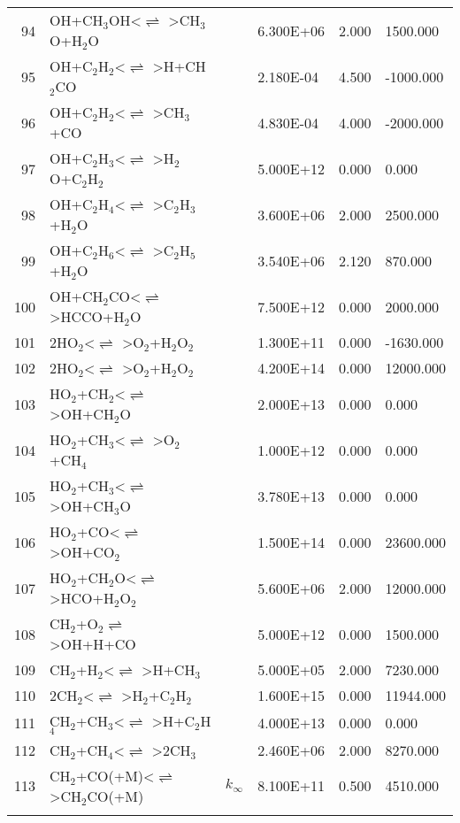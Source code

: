 \documentclass[11pt]{article}
\begin{document}
\begin{table}[hbt]
\begin{tabular}{|r l c l l l|}
94 &	OH+CH$_{3}$OH<$\rightleftharpoons$ >CH$_{3}$O+H$_{2}$O&	&	6.300E+06&	2.000&	1500.000\\ 
95 &	OH+C$_{2}$H$_{2}$<$\rightleftharpoons$ >H+CH$_{2}$CO&	&	2.180E-04&	4.500&	-1000.000\\ 
96 &	OH+C$_{2}$H$_{2}$<$\rightleftharpoons$ >CH$_{3}$+CO&	&	4.830E-04&	4.000&	-2000.000\\ 
97 &	OH+C$_{2}$H$_{3}$<$\rightleftharpoons$ >H$_{2}$O+C$_{2}$H$_{2}$&	&	5.000E+12&	0.000&	0.000\\ 
98 &	OH+C$_{2}$H$_{4}$<$\rightleftharpoons$ >C$_{2}$H$_{3}$+H$_{2}$O&	&	3.600E+06&	2.000&	2500.000\\ 
99 &	OH+C$_{2}$H$_{6}$<$\rightleftharpoons$ >C$_{2}$H$_{5}$+H$_{2}$O&	&	3.540E+06&	2.120&	870.000\\ 
100 &	OH+CH$_{2}$CO<$\rightleftharpoons$ >HCCO+H$_{2}$O&	&	7.500E+12&	0.000&	2000.000\\ 
101 &	2HO$_{2}$<$\rightleftharpoons$ >O$_{2}$+H$_{2}$O$_{2}$&	&	1.300E+11&	0.000&	-1630.000\\ 
102 &	2HO$_{2}$<$\rightleftharpoons$ >O$_{2}$+H$_{2}$O$_{2}$&	&	4.200E+14&	0.000&	12000.000\\ 
103 &	HO$_{2}$+CH$_{2}$<$\rightleftharpoons$ >OH+CH$_{2}$O&	&	2.000E+13&	0.000&	0.000\\ 
104 &	HO$_{2}$+CH$_{3}$<$\rightleftharpoons$ >O$_{2}$+CH$_{4}$&	&	1.000E+12&	0.000&	0.000\\ 
105 &	HO$_{2}$+CH$_{3}$<$\rightleftharpoons$ >OH+CH$_{3}$O&	&	3.780E+13&	0.000&	0.000\\ 
106 &	HO$_{2}$+CO<$\rightleftharpoons$ >OH+CO$_{2}$&	&	1.500E+14&	0.000&	23600.000\\ 
107 &	HO$_{2}$+CH$_{2}$O<$\rightleftharpoons$ >HCO+H$_{2}$O$_{2}$&	&	5.600E+06&	2.000&	12000.000\\ 
108 &	CH$_{2}$+O$_{2}$$\rightleftharpoons$ >OH+H+CO&	&	5.000E+12&	0.000&	1500.000\\ 
109 &	CH$_{2}$+H$_{2}$<$\rightleftharpoons$ >H+CH$_{3}$&	&	5.000E+05&	2.000&	7230.000\\ 
110 &	2CH$_{2}$<$\rightleftharpoons$ >H$_{2}$+C$_{2}$H$_{2}$&	&	1.600E+15&	0.000&	11944.000\\ 
111 &	CH$_{2}$+CH$_{3}$<$\rightleftharpoons$ >H+C$_{2}$H$_{4}$&	&	4.000E+13&	0.000&	0.000\\ 
112 &	CH$_{2}$+CH$_{4}$<$\rightleftharpoons$ >2CH$_{3}$&	&	2.460E+06&	2.000&	8270.000\\ 
113 &	CH$_{2}$+CO(+M)<$\rightleftharpoons$ >CH$_{2}$CO(+M)&	$k_{\infty}$&	8.100E+11&	0.500&	4510.000\\ 
$$
\end{tabular}
\end{table}
\end{document}
